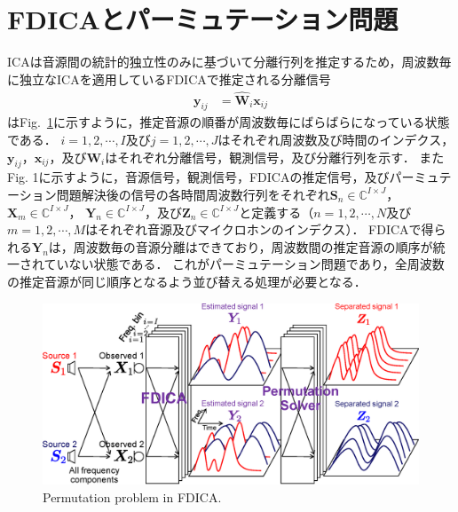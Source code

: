 \documentclass[a4j]{jsarticle}
\begin{document}
\section{FDICAとパーミュテーション問題}
ICAは音源間の統計的独立性のみに基づいて分離行列を推定するため，周波数毎に独立なICAを適用しているFDICAで推定される分離信号
\begin{align}
\bm{y}_{ij} &= \hat{\bm{W}}_i\bm{x}_{ij} \label{eq:sepSig}
\end{align}
はFig.~\ref{fig:permu}に示すように，推定音源の順番が周波数毎にばらばらになっている状態である．
$i = 1,2, \cdots, I$及び$j = 1,2, \cdots, J$はそれぞれ周波数及び時間のインデクス，$\bm{y}_{ij}$，$\bm{x}_{ij}$，及び$\bm{W}_{i}$はそれぞれ分離信号，観測信号，及び分離行列を示す．
またFig. 1に示すように，音源信号，観測信号，FDICAの推定信号，及びパーミュテーション問題解決後の信号の各時間周波数行列をそれぞれ$\bm{S}_n\in\mathbb{C}^{I\times J}$，$\bm{X}_m\in\mathbb{C}^{I\times J}$，
$\bm{Y}_n\in\mathbb{C}^{I\times J}$，及び$\bm{Z}_n\in\mathbb{C}^{I\times J}$と定義する（$n=1, 2, \cdots, N$及び$m=1, 2, \cdots, M$はそれぞれ音源及びマイクロホンのインデクス）．
FDICAで得られる$\bm{Y}_n$は，周波数毎の音源分離はできており，周波数間の推定音源の順序が統一されていない状態である．
これがパーミュテーション問題であり，全周波数の推定音源が同じ順序となるよう並び替える処理が必要となる．
\begin{figure}[t]
  \vspace{15pt}
  \begin{center}
      \includegraphics[width=1.0\columnwidth]{figures/permutation_image.eps}
  \end{center}
  \vspace{-8pt}
\caption{Permutation problem in FDICA.}
\label{fig:permu}
\end{figure}
\end{document}
